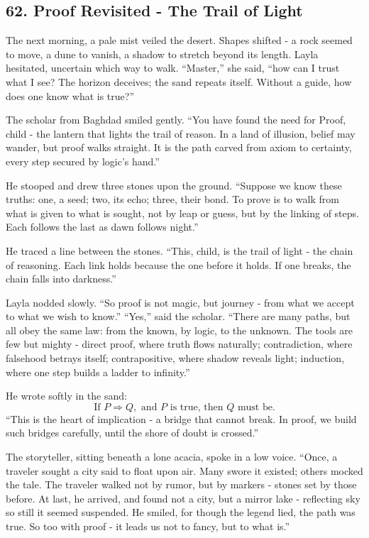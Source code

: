 \documentclass[
  letterpaper,
  DIV=11,
  numbers=noendperiod]{scrreprt}
\begin{document}
\subsection{62. Proof Revisited - The Trail of
Light}\label{proof-revisited---the-trail-of-light}

The next morning, a pale mist veiled the desert. Shapes shifted - a rock
seemed to move, a dune to vanish, a shadow to stretch beyond its length.
Layla hesitated, uncertain which way to walk. ``Master,'' she said,
``how can I trust what I see? The horizon deceives; the sand repeats
itself. Without a guide, how does one know what is true?''

The scholar from Baghdad smiled gently. ``You have found the need for
Proof, child - the lantern that lights the trail of reason. In a land of
illusion, belief may wander, but proof walks straight. It is the path
carved from axiom to certainty, every step secured by logic's hand.''

He stooped and drew three stones upon the ground. ``Suppose we know
these truths: one, a seed; two, its echo; three, their bond. To prove is
to walk from what is given to what is sought, not by leap or guess, but
by the linking of steps. Each follows the last as dawn follows night.''

He traced a line between the stones. ``This, child, is the trail of
light - the chain of reasoning. Each link holds because the one before
it holds. If one breaks, the chain falls into darkness.''

Layla nodded slowly. ``So proof is not magic, but journey - from what we
accept to what we wish to know.'' ``Yes,'' said the scholar. ``There are
many paths, but all obey the same law: from the known, by logic, to the
unknown. The tools are few but mighty - direct proof, where truth flows
naturally; contradiction, where falsehood betrays itself;
contrapositive, where shadow reveals light; induction, where one step
builds a ladder to infinity.''

He wrote softly in the sand: \[
\text{If } P \Rightarrow Q, \text{ and } P \text{ is true, then } Q \text{ must be.}
\] ``This is the heart of implication - a bridge that cannot break. In
proof, we build such bridges carefully, until the shore of doubt is
crossed.''

The storyteller, sitting beneath a lone acacia, spoke in a low voice.
``Once, a traveler sought a city said to float upon air. Many swore it
existed; others mocked the tale. The traveler walked not by rumor, but
by markers - stones set by those before. At last, he arrived, and found
not a city, but a mirror lake - reflecting sky so still it seemed
suspended. He smiled, for though the legend lied, the path was true. So
too with proof - it leads us not to fancy, but to what is.''
\end{document}
